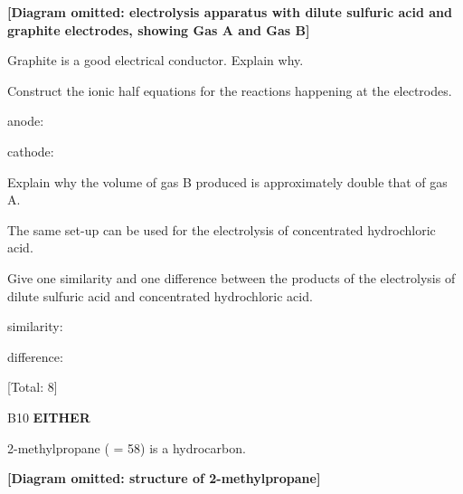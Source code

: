 \documentclass[11pt]{exam}
\makeatletter
\renewcommand{\dotfill}{%
  \leavevmode\cleaders\hb@xt@ 3pt{\hss.\hss}\hfill\kern\z@
}
\makeatother
\begin{document}
\begin{questions}
\begin{parts}
\textbf{[Diagram omitted: electrolysis apparatus with dilute sulfuric acid and graphite electrodes, showing Gas A and Gas B]}

\begin{subparts}
\subpart[1] Graphite is a good electrical conductor. Explain why.
\vspace{2cm}
\dotfill
\vspace{0.5cm}
\dotfill [1]

\subpart[2] Construct the ionic half equations for the reactions happening at the electrodes.

anode:
\vspace{1cm}
\dotfill

cathode:
\vspace{1cm}
\dotfill [2]

\subpart[1] Explain why the volume of gas B produced is approximately double that of gas A.
\vspace{2cm}
\dotfill
\vspace{0.5cm}
\dotfill [1]

\subpart[2] The same set-up can be used for the electrolysis of concentrated hydrochloric acid.

Give one similarity and one difference between the products of the electrolysis of dilute sulfuric acid and concentrated hydrochloric acid.

similarity:
\vspace{1cm}
\dotfill

difference:
\vspace{1cm}
\dotfill [2]
\end{subparts}
\end{parts}

\vfill
\hfill [Total: 8]

\newpage

\question B10 \textbf{EITHER}

2-methylpropane ( = 58) is a hydrocarbon.

\textbf{[Diagram omitted: structure of 2-methylpropane]}

\end{questions}
\end{document}
